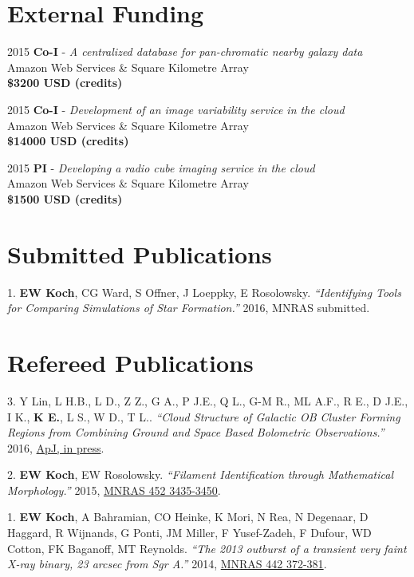 \documentclass[letterpaper,11pt]{article}
\newlength{\mainindent} \setlength{\mainindent}{12pt}
\newlength{\contentindent} \setlength{\contentindent}{19ex}
\newenvironment{datelist}{
  \begingroup
  \raggedright
  \begin{description}[labelindent=\mainindent,leftmargin=\contentindent,
      style=sameline,font=\normalfont,topsep=0pt,partopsep=0pt,parsep=0pt,
      itemsep=4pt]
}{
  \end{description}
  \endgroup
}
\newenvironment{publist}{
  \begingroup
  \raggedright
  \begin{description}[leftmargin=4ex,style=sameline]
}{
  \end{description}
  \endgroup
}
\begin{document}
\section*{External Funding}
\begin{datelist}
\item[2015] \textbf{Co-I} - \emph{A centralized database for pan-chromatic nearby galaxy data} \\ Amazon Web Services \& Square Kilometre Array \\ \textbf{\$3200 USD (credits)}
\item[2015] \textbf{Co-I} - \emph{Development of an image variability service in the cloud} \\ Amazon Web Services \& Square Kilometre Array \\ \textbf{\$14000 USD (credits)}
\item[2015] \textbf{PI} - \emph{Developing a radio cube imaging service in the cloud} \\ Amazon Web Services \& Square Kilometre Array \\ \textbf{\$1500 USD (credits)}
\end{datelist}



\section*{Submitted Publications}

\begin{publist}
\item[1.] \textbf{EW Koch}, CG Ward, S Offner, J Loeppky, E Rosolowsky. \textit{``Identifying Tools for Comparing Simulations of Star Formation.''} 2016, MNRAS submitted.
\end{publist}

\section*{Refereed Publications}

\begin{publist}
\item[3.] Y Lin, L H.B., L D., Z Z., G A., P J.E., Q L., G-M R., ML A.F., R E., D J.E., I K., \textbf{K E.}, L S., W D., T L.. \textit{``Cloud Structure of Galactic OB Cluster Forming Regions from Combining Ground and Space Based Bolometric Observations.''} 2016, \href{http://arxiv.org/abs/1606.07645}{ApJ, in press}.
\item[2.] \textbf{EW Koch}, EW Rosolowsky. \textit{``Filament Identification through Mathematical Morphology.''} 2015, \href{http://adsabs.harvard.edu/abs/2015MNRAS.452.3435K}{MNRAS 452 3435-3450}.
\item[1.] \textbf{EW Koch}, A Bahramian, CO Heinke, K Mori, N Rea, N Degenaar, D Haggard, R Wijnands, G Ponti, JM Miller, F Yusef-Zadeh, F Dufour, WD Cotton, FK Baganoff, MT Reynolds. \textit{``The 2013 outburst of a transient very faint X-ray binary, 23 arcsec from Sgr A\textasteriskcentered.''} 2014, \href{http://adsabs.harvard.edu/abs/2014MNRAS.442..372K}{MNRAS 442 372-381}.
\end{publist}
\end{document}
